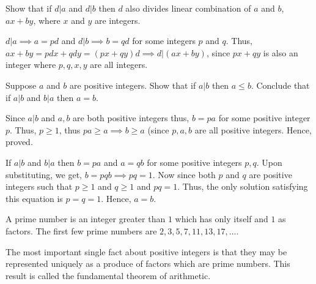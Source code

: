 \begin{example}
    Show that if $d|a$ and $d|b$ then $d$ also divides linear combination of $a$ and $b$, $ax+by$, where $x$ and $y$ are integers.

    
$d|a \implies a=pd$ and $d|b \implies b=qd$ for some integers $p$ and $q$. Thus, $ax+by= pdx+qdy = (px+qy)d \implies d|(ax+by)$, since $px+qy$ is also an integer where $p,q,x,y$ are all integers.
\end{example}
\begin{example}
    Suppose $a$ and $b$ are positive integers. Show that if $a|b$ then $a\leq b$. Conclude that if $a|b$ and $b|a$ then $a=b$.

    Since $a|b$ and $a,b$ are both positive integers thus, $b = pa$ for some positive integer $p$. Thus, $p\geq 1$, thus $pa\geq a \implies b\geq a$ (since $p,a,b$ are all positive integers. Hence, proved. 
    
    If $a|b$ and $b|a$ then $b=pa$ and $a=qb$ for some positive integers $p,q$. Upon substituting, we get, $b=pqb \implies pq=1$. Now since both $p$ and $q$ are positive integers such that $p\geq 1$ and $q\geq 1$ and $pq=1$. Thus, the only solution satisfying this equation is $p=q=1$. Hence, $a=b$.
\end{example}

\begin{definition}
    A prime number is an integer greater than $1$ which has only itself and $1$ as factors. The first few prime numbers are $2,3,5,7,11,13,17,\ldots$.
\end{definition}
The most important single fact about positive integers is that they may be represented uniquely as a produce of factors which are prime numbers. This result is called the fundamental theorem of arithmetic.

